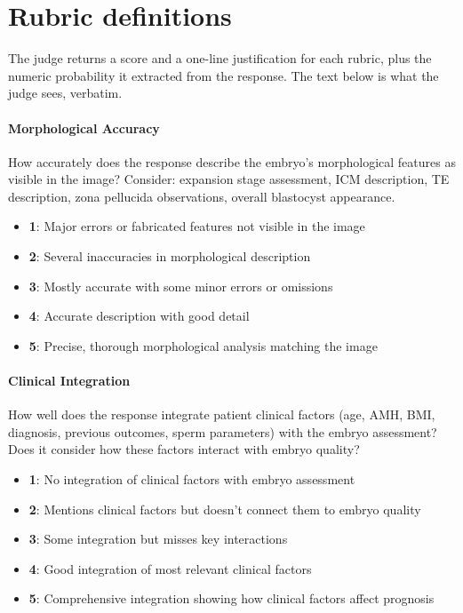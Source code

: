 \documentclass[11pt]{article}
\begin{document}
\section{Rubric definitions}
\label{app:rubrics}
The judge returns a score and a one-line justification for each rubric, plus the numeric probability it extracted from the response. The text below is what the judge sees, verbatim.

\paragraph{Morphological Accuracy}
How accurately does the response describe the embryo's morphological features as visible in the image? Consider: expansion stage assessment, ICM description, TE description, zona pellucida observations, overall blastocyst appearance.
\begin{itemize}
\item \textbf{1}: Major errors or fabricated features not visible in the image
\item \textbf{2}: Several inaccuracies in morphological description
\item \textbf{3}: Mostly accurate with some minor errors or omissions
\item \textbf{4}: Accurate description with good detail
\item \textbf{5}: Precise, thorough morphological analysis matching the image
\end{itemize}

\paragraph{Clinical Integration}
How well does the response integrate patient clinical factors (age, AMH, BMI, diagnosis, previous outcomes, sperm parameters) with the embryo assessment? Does it consider how these factors interact with embryo quality?
\begin{itemize}
\item \textbf{1}: No integration of clinical factors with embryo assessment
\item \textbf{2}: Mentions clinical factors but doesn't connect them to embryo quality
\item \textbf{3}: Some integration but misses key interactions
\item \textbf{4}: Good integration of most relevant clinical factors
\item \textbf{5}: Comprehensive integration showing how clinical factors affect prognosis
\end{itemize}
\end{document}
